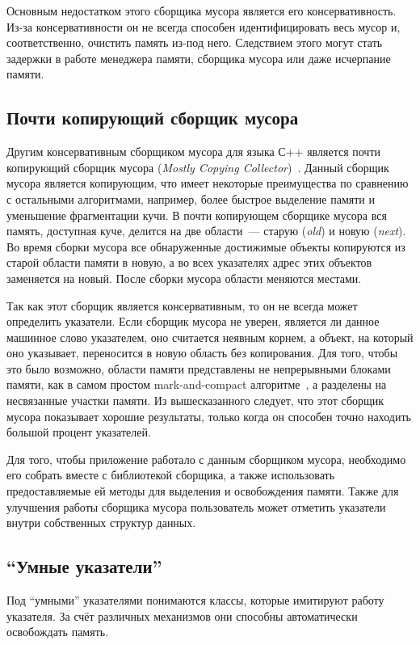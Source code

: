 Основным недостатком этого сборщика мусора является его консервативность. Из-за консервативности он не всегда способен идентифицировать весь мусор и, соответственно, очистить память из-под него. Следствием этого могут стать задержки в работе менеджера памяти, сборщика мусора или даже исчерпание памяти. 

\subsection{Почти копирующий сборщик мусора}
Другим консервативным сборщиком мусора для языка С++ является почти копирующий сборщик мусора (\textit{Mostly Copying Collector})~\cite{mcc1, mcc2}. 
Данный сборщик мусора является копирующим, что имеет некоторые преимущества по сравнению с остальными алгоритмами, например, более быстрое выделение памяти и уменьшение фрагментации кучи. В почти копирующем сборщике мусора вся память, доступная куче, делится на две области~--- старую (\textit{old}) и новую (\textit{next}). Во время сборки мусора все обнаруженные достижимые объекты копируются из старой области памяти в новую, а во всех указателях адрес этих объектов заменяется на новый. После сборки мусора области меняются местами. 

Так как этот сборщик является консервативным, то он не всегда может определить указатели. Если сборщик мусора не уверен, является ли данное машинное слово указателем, оно считается неявным корнем, а объект, на который оно указывает, переносится в новую область без копирования. Для того, чтобы это было возможно, области памяти представлены не непрерывными блоками памяти, как в самом простом mark-and-compact алгоритме~\cite{lisp-copy}, а разделены на несвязанные участки памяти. Из вышесказанного следует, что этот сборщик мусора показывает хорошие результаты, только когда он способен точно находить большой процент указателей.

Для того, чтобы приложение работало с данным сборщиком мусора, необходимо его собрать вместе с библиотекой сборщика, а также использовать предоставляемые ей методы для выделения и освобождения памяти. Также для улучшения работы сборщика мусора пользователь может отметить указатели внутри собственных структур данных.

\subsection{``Умные указатели''}
Под ``умными'' указателями понимаются классы, которые имитируют работу указателя. За счёт различных механизмов они способны автоматически освобождать память.

